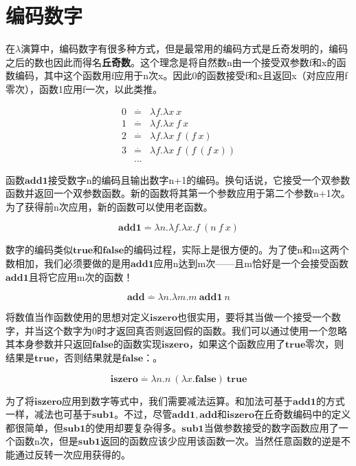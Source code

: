 \documentclass{book}
\begin{document}
\section{编码数字}
在$\lambda$演算中，编码数字有很多种方式，但是最常用的编码方式是丘奇发明的，编码之后的数也因此而得名\textbf{丘奇数}。这个理念是将自然数n由一个接受双参数f和x的函数编码，其中这个函数用f应用于n次x。因此0的函数接受f和x且返回x（对应应用f零次），函数1应用f一次，以此类推。
\begin{framed}
 $$
 \begin{array}{lll}
 0 & \stackrel{.}{=} & \lambda f.\lambda x\ x\\
 1 & \stackrel{.}{=} & \lambda f.\lambda x\ f\ x\\
 2 & \stackrel{.}{=} & \lambda f.\lambda x\ f\ (f\ x)\\
 3 & \stackrel{.}{=} & \lambda f.\lambda x\ f\ (f\ (f\ x))\\
 & \ldots &
 \end{array}
 $$
\end{framed}
 函数$\mathbf{add1}$接受数字n的编码且输出数字n+1的编码。换句话说，它接受一个双参数函数并返回一个双参数函数。新的函数将其第一个参数应用于第二个参数n+1次。为了获得前n次应用，新的函数可以使用老函数。
 \begin{framed}
  $$\mathbf{add1}\stackrel{.}{=}\lambda n.\lambda f.\lambda x.f\ (n\ f\ x)$$
 \end{framed}
 数字的编码类似$\mathbf{true}$和$\mathbf{false}$的编码过程，实际上是很方便的。为了使n和m这两个数相加，我们必须要做的是用$\mathbf{add1}$应用n达到m次——且m恰好是一个会接受函数$\mathbf{add1}$且将它应用m次的函数！
 \begin{framed}
  $$\mathbf{add}\stackrel{.}{=}\lambda n.\lambda m.m\ \mathbf{add1}\ n$$
 \end{framed}
将数值当作函数使用的思想对定义$\mathbf{iszero}$也很实用，要将其当做一个接受一个数字，并当这个数字为0时才返回真否则返回假的函数。我们可以通过使用一个忽略其本身参数并只返回$\mathbf{false}$的函数实现$\mathbf{iszero}$，如果这个函数应用了$\mathbf{true}$零次，则结果是$\mathbf{true}$，否则结果就是$\mathbf{false}$：。
 \begin{framed}
  $$ \mathbf{iszero}\stackrel{.}{=}\lambda n.n\ (\lambda x.\mathbf{false})\ \mathbf{true} $$
 \end{framed}
为了将$\mathbf{iszero}$应用到数字等式中，我们需要减法运算。和加法可基于$\mathbf{add1}$的方式一样，减法也可基于$\mathbf{sub1}$。不过，尽管$\mathbf{add1},\mathbf{add}$和$\mathbf{iszero}$在丘奇数编码中的定义都很简单，但$\mathbf{sub1}$的使用却要复杂得多。$\mathbf{sub1}$当做参数接受的数字函数应用了一个函数n次，但是$\mathbf{sub1}$返回的函数应该少应用该函数一次。当然任意函数的逆是不能通过反转一次应用获得的。\par
\end{document}
